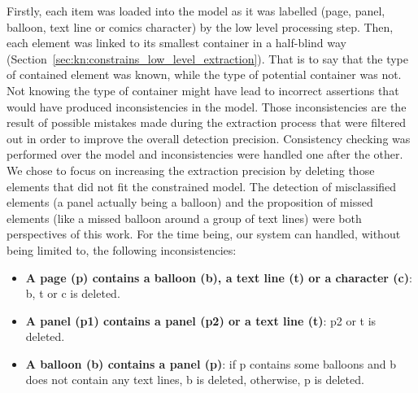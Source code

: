 {Firstly, each item was loaded into the model as it was labelled (page, panel, balloon, text line or comics character) by the low level processing step.
Then, each element was linked to its smallest container in a half-blind way (Section~\ref{sec:kn:constrains_low_level_extraction}).
That is to say that the type of contained element was known, while the type of  potential container was not.
Not knowing the type of container might have lead to incorrect assertions that would have produced inconsistencies in the model.
Those inconsistencies are the result of possible mistakes made during the extraction process that were filtered out in order to improve the overall detection precision.
Consistency checking was performed over the model and inconsistencies were handled one after the other.
We chose to focus on increasing the extraction precision by deleting those elements that did not fit the constrained model.
The detection of misclassified elements (a panel actually being a balloon) and the proposition of missed elements (like a missed balloon around a group of text lines) were both perspectives of this work.
For the time being, our system can handled, without being limited to, the following inconsistencies:
\begin{itemize}
	\item \textbf{A page (p) contains a balloon (b), a text line (t) or a character (c)}: b, t or c is deleted.
	\item \textbf{A panel (p1) contains a panel (p2) or a text line (t)}: p2 or t is deleted.
 	\item \textbf{A balloon (b) contains a panel (p)}: if p contains some balloons and b does not contain any text lines, b is deleted, otherwise, p is deleted.

\end{itemize}}
